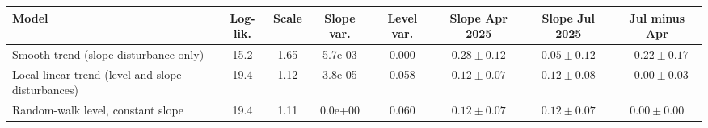 \begin{tabular}{lccccccc}
\toprule
Model & Log-lik. & Scale & Slope var. & Level var. & Slope Apr 2025 & Slope Jul 2025 & Jul minus Apr \\
\midrule
Smooth trend (slope disturbance only) & 15.2 & 1.65 & 5.7e-03 & 0.000 & $0.28 \pm 0.12$ & $0.05 \pm 0.12$ & $-0.22 \pm 0.17$ \\
Local linear trend (level and slope disturbances) & 19.4 & 1.12 & 3.8e-05 & 0.058 & $0.12 \pm 0.07$ & $0.12 \pm 0.08$ & $-0.00 \pm 0.03$ \\
Random-walk level, constant slope & 19.4 & 1.11 & 0.0e+00 & 0.060 & $0.12 \pm 0.07$ & $0.12 \pm 0.07$ & $0.00 \pm 0.00$ \\
\bottomrule
\end{tabular}
